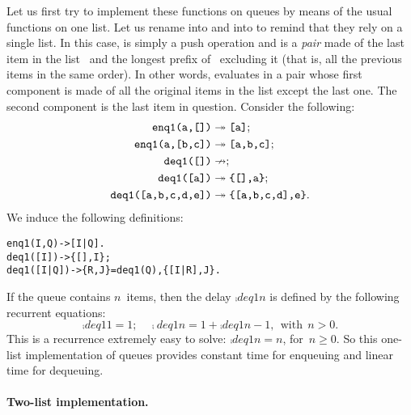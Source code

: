 Let us first try to implement these functions on queues by means of
the usual functions on one list. Let us rename 
into  and  into  to
remind that they rely on a single list. In this case, 
is simply a push operation and  is a \emph{pair} made
of the last item in the list~ and the longest prefix
of~ excluding it (that is, all the previous items in the
same order). In other words,  evaluates in a pair
whose first component is made of all the original items in the list
except the last one. The second component is the last item in
question. Consider the following:
\begin{align*}
\texttt{enq1(a,[])}        &\twoheadrightarrow \texttt{[a]};\\
\texttt{enq1(a,[b,c])}     &\twoheadrightarrow \texttt{[a,b,c]};\\
\texttt{deq1([])}          &\nrightarrow;\\
\texttt{deq1([a])}         &\twoheadrightarrow \texttt{\{[],a\}};\\
\texttt{deq1([a,b,c,d,e])} &\twoheadrightarrow \texttt{\{[a,b,c,d],e\}}.
\end{align*}
We induce the following \Erlang definitions:
\begin{alltt}
enq1(I,Q)   -> [I|Q].\hfill% \emph{Queue} Q \emph{is a list}
deq1(  [I]) -> \{[],I\};
deq1([I|Q]) -> \{R,J\}=deq1(Q), \{[I|R],J\}.
\end{alltt}
If the queue contains \(n\)~items, then the delay \(\comp{deq1}{n}\)
is defined by the following recurrent equations:
\[
\comp{deq1}{1} = 1;\quad
\comp{deq1}{n} = 1 + \comp{deq1}{n-1}, \,\; \text{with} \,\; n > 0.
\]
This is a recurrence extremely easy to solve: \(\comp{deq1}{n} = n\),
for~\(n \geqslant 0\). So this one\hyp{}list implementation of queues
provides constant time for enqueuing and linear time for dequeuing.

\medskip

\paragraph{Two\hyp{}list implementation.}

